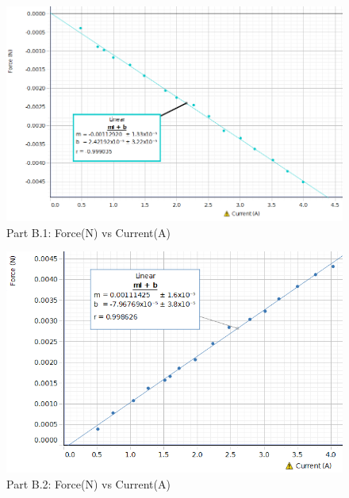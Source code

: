 \documentclass[../Lab.tex]{subfiles}
\begin{document}
\begin{figure}[H] %
	\centering %
	\includegraphics[width=1\textwidth]{Figures/Lab 9 set2.PNG} %
	\caption{Part B.1: Force(N) vs Current(A)}
\end{figure}
\begin{figure}[H] %
	\centering %
	\includegraphics[width=1\textwidth]{Figures/Lab 9 set4.PNG} %
	\caption{Part B.2: Force(N) vs Current(A)}
\end{figure}
\end{document}
